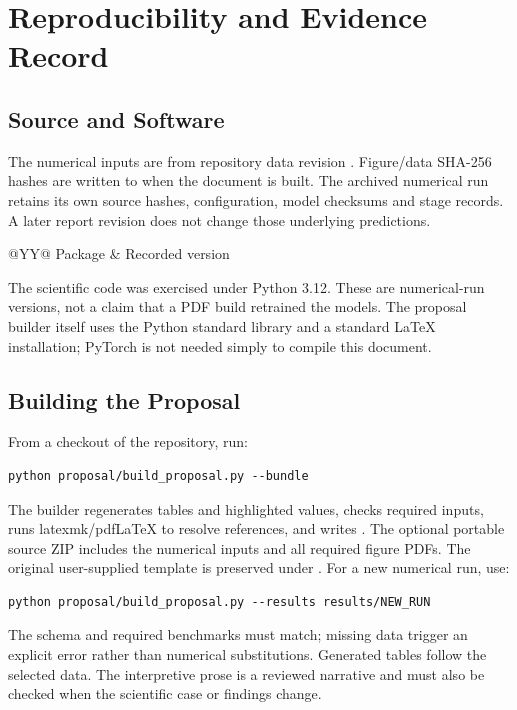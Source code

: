 \chapter{Reproducibility and Evidence Record}
\label{app:reproducibility}
\section{Source and Software}
The numerical inputs are from repository data revision
\texttt{\EvidenceRevision}. Figure/data SHA-256 hashes are written to
 when the document is built. The
archived numerical run retains its own source hashes, configuration, model
checksums and stage records. A later report revision does not change those
underlying predictions.

\begin{table}[!htbp]
\centering\small
\caption{Software versions recorded with the numerical evidence.}
\label{tab:software}
\begin{tabularx}{\textwidth}{@{}YY@{}}
\toprule Package & Recorded version\\\midrule
{}
\bottomrule
\end{tabularx}
\end{table}
The scientific code was exercised under Python 3.12. These are numerical-run
versions, not a claim that a PDF build retrained the models. The proposal
builder itself uses the Python standard library and a standard LaTeX
installation; PyTorch is not needed simply to compile this document.

\section{Building the Proposal}
From a checkout of the repository, run:
\begin{lstlisting}
python proposal/build_proposal.py --bundle
\end{lstlisting}
The builder regenerates tables and highlighted values, checks required
inputs, runs latexmk/pdfLaTeX to resolve references, and writes
. The optional portable source ZIP
includes the numerical inputs and all required figure PDFs. The original
user-supplied template is preserved under .
For a new numerical run, use:
\begin{lstlisting}
python proposal/build_proposal.py --results results/NEW_RUN
\end{lstlisting}
The schema and required benchmarks must match; missing data trigger an
explicit error rather than numerical substitutions. Generated tables follow
the selected data. The interpretive prose is a reviewed narrative and must
also be checked when the scientific case or findings change.

